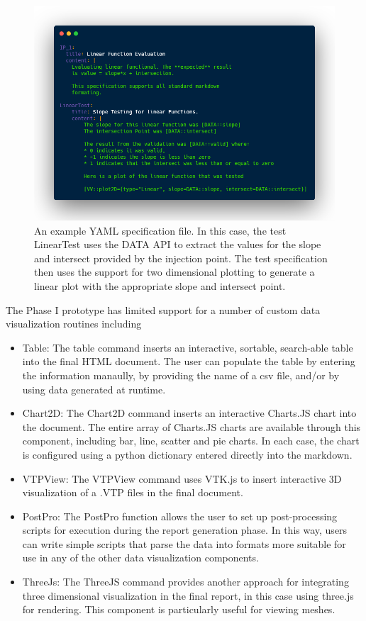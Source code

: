 \begin{figure}
 \includegraphics[width=\textwidth]{./Figures/yaml-md.png}
\caption{ An example YAML specification file. In this case, the test LinearTest uses the DATA API to extract the values for the slope and intersect provided by the injection 
point. The test specification then uses the support for two dimensional plotting to generate a linear plot with the appropriate slope and intersect point. \label{fig:test-spec}}
 \end{figure}

The Phase I prototype has limited support for a number of custom data visualization routines including 
\begin{itemize}
\item Table: The table command inserts an interactive, sortable, search-able table into the final HTML document. The user can populate the table by entering the information
manaully, by providing the name of a csv file, and/or by using data generated at runtime. 
\item Chart2D: The Chart2D command inserts an interactive Charts.JS chart into the document. The entire array of Charts.JS charts are available through this component, including bar, 
line, scatter and pie charts. In each case, the chart is configured using a python dictionary entered directly into the markdown. 
\item VTPView: The VTPView command uses VTK.js to insert interactive 3D visualization of a .VTP files in the final document. 
\item PostPro: The PostPro function allows the user to set up post-processing scripts for execution during the report generation phase. In this way,
users can write simple scripts that parse the data into formats more suitable for use in any of the other data visualization components. 
\item ThreeJs: The ThreeJS command provides another approach for integrating three dimensional visualization in the final report, in this case using three.js for rendering. This 
component is particularly useful for viewing meshes. 
\end{itemize}

